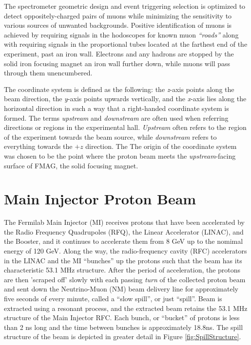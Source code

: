 The spectrometer geometric design and event
triggering selection is optimized to detect oppositely-charged pairs of muons while minimizing the sensitivity
to various sources of unwanted backgrounds. Positive identification of muons is achieved by requiring signals
in the hodoscopes for known muon \emph{``roads''} along with requiring signals in the proportional tubes located at
the farthest end of the experiment, past an iron wall. Electrons and any hadrons are stopped by the solid iron
focusing magnet an iron wall further down, while muons will pass through them unencumbered.

The coordinate system is defined as the following: the \emph{z}-axis points along the beam direction, the
\emph{y}-axis points upwards vertically, and the \emph{x}-axis lies along the horizontal direction
in such a way that a right-handed coordinate system is formed. The terms \emph{upstream} and 
\emph{downstream} are often used when referring directions or regions in the experimental hall.
\emph{Upstream} often refers to the region of the experiment towards the beam source, while
\emph{downstream} refers to everything towards the $+z$ direction. 
The The origin of the coordinate system was chosen to be the point where the proton beam meets 
the \emph{upstream}-facing surface of FMAG, the solid focusing magnet.


\section{Main Injector Proton Beam}


The Fermilab Main Injector (MI) receives protons that have been accelerated by the Radio Frequency Quadrupoles (RFQ), 
the Linear Accelerator (LINAC), and the Booster, and it continues to accelerate them from 8 GeV up to the nomimal energy
of 120 GeV. Along the way, the radio-frequency cavity (RFC) accelerators in the LINAC and the MI ``bunches'' up the
protons such that the beam has its characteristic 53.1 MHz structure. After the period of acceleration, the protons
are then 'scraped off' slowly with each passing \emph{turn} of the collected proton beam and sent down the
Neutrino-Muon (NM) beam delivery line for approximately five seconds of every minute, called a ``slow spill'', or just
``spill''. Beam is extracted using a resonant process, and the extracted beam retains the 53.1 MHz structure of the
Main Injector RFC. Each bunch, or ``bucket'' of protons is less than 2 ns long and the time between bunches is approximately
18.8ns. The spill structure of the beam is depicted in greater detail in Figure \ref{fig:SpillStructure}.

